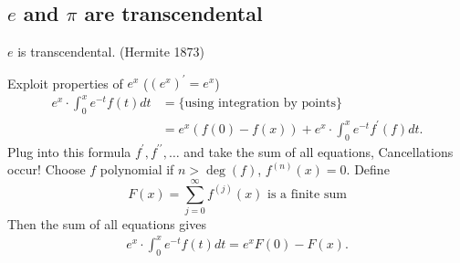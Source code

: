 \documentclass[NumTh.tex]{subfiles}
\begin{document}
\subsection{$e$ and $\pi$ are transcendental}

\begin{theorem}
  $e$ is transcendental. (Hermite 1873)
\end{theorem}

Exploit properties of $e^x$ ($(e^x)^\prime = e^x$)
\begin{align*}
  e^x \cdot \int_0^x e^{-t} f(t) dt &= \{ \text{using integration by points} \} \\
  &= e^x (f(0) - f(x)) + e^x \cdot \int_0^x e^{-t} f^\prime(f) dt \text{.}
\end{align*}
Plug into this formula $f^\prime, f^{\prime \prime},\dots$ and take the sum of all equations, Cancellations occur!
Choose $f$ polynomial if $n > \deg(f)$, $f^{(n)}(x) = 0$.
Define
\[ F(x) = \sum_{j=0}^\infty f^{(j)}(x) \text{ is a finite sum} \]
Then the sum of all equations gives
\begin{align} \label{doublestar}
  e^x \cdot \int_0^x e^{-t} f(t) dt = e^x F(0) - F(x) \text{.}
\end{align}
\end{document}

